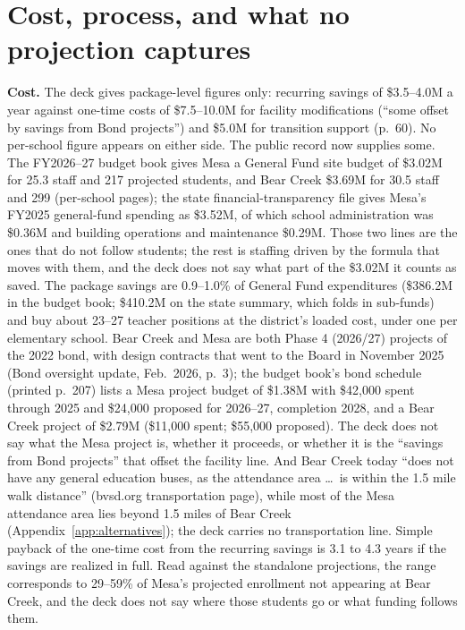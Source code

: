 \documentclass[11pt]{article}
\begin{document}
\section{Cost, process, and what no projection captures}\label{sec:s5}
\textbf{Cost.} The deck gives package-level figures only: recurring savings of \$3.5--4.0M a year against one-time costs of \$7.5--10.0M for facility modifications (``some offset by savings from Bond projects'') and \$5.0M for transition support (p.\ 60). No per-school figure appears on either side. The public record now supplies some. The FY2026--27 budget book gives Mesa a General Fund site budget of \$3.02M for 25.3 staff and 217 projected students, and Bear Creek \$3.69M for 30.5 staff and 299 (per-school pages); the state financial-transparency file gives Mesa's FY2025 general-fund spending as \$3.52M, of which school administration was \$0.36M and building operations and maintenance \$0.29M. Those two lines are the ones that do not follow students; the rest is staffing driven by the formula that moves with them, and the deck does not say what part of the \$3.02M it counts as saved. The package savings are 0.9--1.0\% of General Fund expenditures (\$386.2M in the budget book; \$410.2M on the state summary, which folds in sub-funds) and buy about 23--27 teacher positions at the district's loaded cost, under one per elementary school. Bear Creek and Mesa are both Phase 4 (2026/27) projects of the 2022 bond, with design contracts that went to the Board in November 2025 (Bond oversight update, Feb.\ 2026, p.\ 3); the budget book's bond schedule (printed p.\ 207) lists a Mesa project budget of \$1.38M with \$42,000 spent through 2025 and \$24,000 proposed for 2026--27, completion 2028, and a Bear Creek project of \$2.79M (\$11,000 spent; \$55,000 proposed). The deck does not say what the Mesa project is, whether it proceeds, or whether it is the ``savings from Bond projects'' that offset the facility line. And Bear Creek today ``does not have any general education buses, as the attendance area \ldots\ is within the 1.5 mile walk distance'' (bvsd.org transportation page), while most of the Mesa attendance area lies beyond 1.5 miles of Bear Creek (Appendix~\ref{app:alternatives}); the deck carries no transportation line. Simple payback of the one-time cost from the recurring savings is 3.1 to 4.3 years if the savings are realized in full. Read against the standalone projections, the range corresponds to 29--59\% of Mesa's projected enrollment not appearing at Bear Creek, and the deck does not say where those students go or what funding follows them.
\end{document}
